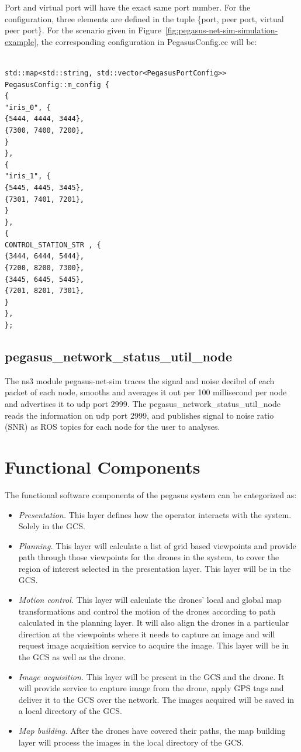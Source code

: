 Port and virtual port will have the exact same port number. For the configuration, three elements are defined in the tuple \{port, peer port, virtual peer port\}. For the scenario given in Figure~\ref{fig:pegasus-net-sim-simulation-example}, the corresponding configuration in PegasusConfig.cc will be:

\begin{verbatim}

std::map<std::string, std::vector<PegasusPortConfig>> 
PegasusConfig::m_config {
{
"iris_0", {
{5444, 4444, 3444},
{7300, 7400, 7200},
}
},
{
"iris_1", {
{5445, 4445, 3445},
{7301, 7401, 7201},
}
},
{
CONTROL_STATION_STR , {
{3444, 6444, 5444},
{7200, 8200, 7300},
{3445, 6445, 5445},
{7201, 8201, 7301},
}
},
};
\end{verbatim}

\subsection{pegasus\_network\_status\_util\_node}

The ns3 module pegasus-net-sim traces the signal and noise decibel of each packet of each node, smooths and averages it out per 100 millisecond per node and advertises it to udp port 2999. The pegasus\_network\_status\_util\_node reads the information on udp port 2999, and publishes signal to noise ratio (SNR) as ROS topics for each node for the user to analyses. 

\section{Functional Components}
The functional software components of the pegasus system can be categorized as:
\begin{itemize}
	\item \textit{Presentation.} This layer defines how the operator interacts with the system. Solely in the GCS.
	\item \textit{Planning.} This layer will calculate a list of grid based viewpoints and provide path through those viewpoints for the drones in the system, to cover the region of interest selected in the presentation layer. This layer will be in the GCS. 
	\item \textit{Motion control.} This layer will calculate the drones' local and global map transformations and control the motion of the drones according to path calculated in the planning layer. It will also align the drones in a particular direction at the viewpoints where it needs to capture an image and will request image acquisition service to acquire the image. This layer will be in the GCS as well as the drone.
	\item \textit{Image acquisition.}  This layer will be present in the GCS and the drone. It will provide service to capture image from the drone, apply GPS tags and deliver it to the GCS over the network. The images acquired will be saved in a local directory of the GCS.
	\item \textit{Map building.} After the drones have covered their paths, the map building layer will process the images in the local directory of the GCS.
\end{itemize}

